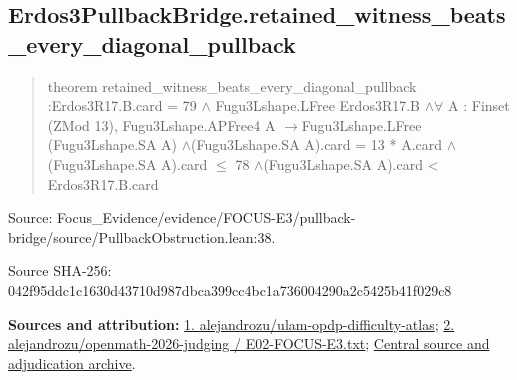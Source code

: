 \documentclass[11pt,a4paper]{article}
\begin{document}
\begin{samepage}
\subsection{Erdos3PullbackBridge.retained\_witness\_beats\_every\_diagonal\_pullback}
\begin{quote}\small\ttfamily theorem retained\_witness\_beats\_every\_diagonal\_pullback :\newline     Erdos3R17.B.card = 79 \ensuremath{\wedge} Fugu3Lshape.LFree Erdos3R17.B \ensuremath{\wedge}\newline     \ensuremath{\forall} A : Finset (ZMod 13), Fugu3Lshape.APFree4 A \ensuremath{\to}\newline       Fugu3Lshape.LFree (Fugu3Lshape.SA A) \ensuremath{\wedge}\newline       (Fugu3Lshape.SA A).card = 13 * A.card \ensuremath{\wedge}\newline       (Fugu3Lshape.SA A).card \ensuremath{\leq} 78 \ensuremath{\wedge}\newline       (Fugu3Lshape.SA A).card < Erdos3R17.B.card\end{quote}
{\small Source: Focus\_Evidence/evidence/FOCUS-E3/pullback-bridge/source/PullbackObstruction.lean:38.\par}

{\small Source SHA-256: 042f95ddc1c1630d43710d987dbca399cc4bc1a736004290a2c5425b41f029c8\par}

{\small\textbf{Sources and attribution:} \href{https://github.com/alejandrozu/ulam-opdp-difficulty-atlas}{1. alejandrozu/ulam-opdp-difficulty-atlas}; \href{https://github.com/alejandrozu/openmath-2026-judging/blob/d0ed487f487fa7ec814ff705ab55249983fe8707/OpenMath-Judging/review/entries/E02-FOCUS-E3.txt}{2. alejandrozu/openmath-2026-judging / E02-FOCUS-E3.txt}; \href{https://github.com/alejandrozu/openmath-2026-judging}{Central source and adjudication archive}.\par}

\end{samepage}
\end{document}
